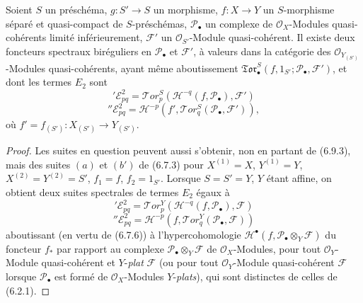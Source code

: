 \begin{proposition}[6.9.8]
Soient $S$ un préschéma, $g:S'\to S$ un morphisme,
$f:X\to Y$ un $S$-morphisme séparé et quasi-compact de $S$-préschémas,
$\mathscr P_\bullet$ un complexe de $\mathscr O_X$-Modules quasi-cohérents
limité inférieurement, $\mathscr F'$ un $\mathscr O_{S'}$-Module
quasi-cohérent. Il existe deux foncteurs spectraux biréguliers en
$\mathscr P_\bullet$ et $\mathscr F'$, à valeurs dans la catégorie des
$\mathscr O_{Y_{(S')}}$-Modules quasi-cohérents, ayant même aboutissement
$\mathfrak{Tor}_\bullet^S(f,1_{S'};\mathscr P_\bullet,\mathscr F')$, et dont
les termes $E_2$ sont
\[
  {}'\mathscr E_{pq}^2
  =\mathscr{T}\!or_p^S
  (\mathscr H^{-q}(f,\mathscr P_\bullet),\mathscr F')
  \tag{6.9.8.1}\label{III.6.9.8.1.fr}
\]
\[
  {}''\mathscr E_{pq}^2
  =\mathscr H^{-p}
  (f',\mathscr{T}\!or_q^S(\mathscr P_\bullet,\mathscr F')),
  \tag{6.9.8.2}\label{III.6.9.8.2.fr}
\]
où $f'=f_{(S')}:X_{(S')}\to Y_{(S')}$. 
\end{proposition}

\begin{proof}
Les suites en question peuvent aussi s'obtenir, non en partant de (6.9.3),
mais des suites $(a)$ et $(b')$ de (6.7.3) pour
$X^{(1)}=X$, $Y^{(1)}=Y$, $X^{(2)}=Y^{(2)}=S'$, $f_1=f$,
$f_2=1_{S'}$. Lorsque $S=S'=Y$, $Y$ étant affine, on obtient deux suites
spectrales de termes $E_2$ égaux à
\[
  {}'\mathscr E_{pq}^2
  =\mathscr{T}\!or_p^Y
  (\mathscr H^{-q}(f,\mathscr P_\bullet),\mathscr F)
  \tag{6.9.8.3}\label{III.6.9.8.3.fr}
\]
\[
  {}''\mathscr E_{pq}^2
  =\mathscr H^{-p}
  (f,\mathscr{T}\!or_q^Y(\mathscr P_\bullet,\mathscr F))
  \tag{6.9.8.4}\label{III.6.9.8.4.fr}
\]
aboutissant (en vertu de (6.7.6)) à l'hypercohomologie
$\mathscr H^\bullet(f,\mathscr P_\bullet\otimes_Y\mathscr F)$ du foncteur
$f_*$ par rapport au complexe
$\mathscr P_\bullet\otimes_Y\mathscr F$ de $\mathscr O_X$-Modules, pour tout
$\mathscr O_Y$-Module quasi-cohérent et $Y$-\emph{plat} $\mathscr F$ (ou pour tout
$\mathscr O_Y$-Module quasi-cohérent $\mathscr F$ lorsque
$\mathscr P_\bullet$ est formé de $\mathscr O_X$-Modules $Y$-\emph{plats}), qui sont
distinctes de celles de (6.2.1).
\end{proof}

